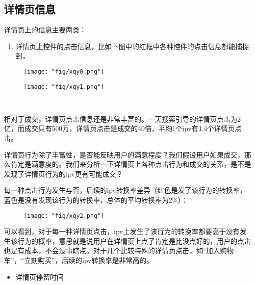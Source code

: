\subsection{详情页信息}
详情页上的信息主要两类：
\begin{enumerate}
\item 详情页上控件的点击信息，比如下图中的红框中各种控件的点击信息都能捕捉到。
\end{enumerate}
\begin{figure}[!h]
	\centering
	\texttt{[image: "fig/xqy0.png"]}
	\caption{}
	\label{fig:xqy0}
\end{figure}
\begin{figure}[!h]
	\centering
	\texttt{[image: "fig/xqy1.png"]}
	\caption{}
	\label{fig:xqy1}
\end{figure}
​​​\par 相对于成交，详情页点击信息还是非常丰富的。一天搜索引导的详情页点击为2亿，而成交只有500万，详情页点击是成交的40倍，平均1个ipv有1.4个详情页点击。
\par 详情页行为除了丰富性，是否能反映用户的满意程度？我们假设用户如果成交，那么肯定是满意度的。我们来分析一下详情页上各种点击行为和成交的关系，是不是发现了详情页行为的ipv更有可能成交？
\par 每一种点击行为发生与否，后续的ipv转换率差异（红色是发了该行为的转换率，蓝色是没有发现该行为的转换率，总体的平均转换率为2\%）：
\begin{figure}[!h]
	\centering
	\texttt{[image: "fig/xqy2.png"]}
	\caption{}
	\label{fig:xqy2}
\end{figure}
\par 可以看到，对于每一种详情页点击，ipv上发生了该行为的转换率都要高于没有发生该行为的概率，意思就是说用户在详情页上点了肯定是比没点好的，用户的点击也是有成本，不会没事瞎点。对于几个比较特殊的详情页点击，如“加入购物车”，“立刻购买”，后续的ipv转换率是非常高的。
\begin{itemize}
\item 详情页停留时间
\end{itemize}

